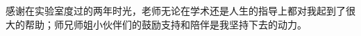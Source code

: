 \documentclass[winfonts,mf,twoside,AutoFakeBold = {2}]{njuthesis}
\begin{document}

















\begin{acknowledgement}
	感谢在实验室度过的两年时光，老师无论在学术还是人生的指导上都对我起到了很大的帮助；师兄师姐小伙伴们的鼓励支持和陪伴是我坚持下去的动力。
\end{acknowledgement}
\end{document}

